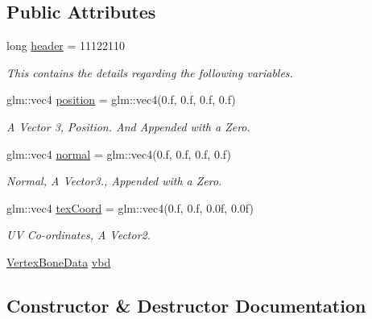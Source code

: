 \subsection*{Public Attributes}
\begin{DoxyCompactItemize}
\item 
long \mbox{\hyperlink{structpiolot_1_1_animated_vertex_data_aceada2166f0ac3779f700d39f6eee5c1}{header}} = 11122110
\begin{DoxyCompactList}\small\item\em This contains the details regarding the following variables. \end{DoxyCompactList}\item 
glm\+::vec4 \mbox{\hyperlink{structpiolot_1_1_animated_vertex_data_a9947f0e7811c173ff80c1cf345ec5d42}{position}} = glm\+::vec4(0.f, 0.f, 0.f, 0.f)
\begin{DoxyCompactList}\small\item\em A Vector 3, Position. And Appended with a Zero. \end{DoxyCompactList}\item 
glm\+::vec4 \mbox{\hyperlink{structpiolot_1_1_animated_vertex_data_a42fe3afa838bcb9951849b914fd43a9d}{normal}} = glm\+::vec4(0.f, 0.f, 0.f, 0.f)
\begin{DoxyCompactList}\small\item\em Normal, A Vector3., Appended with a Zero. \end{DoxyCompactList}\item 
glm\+::vec4 \mbox{\hyperlink{structpiolot_1_1_animated_vertex_data_ad8c5dfde767f37338b9f5497081ae0e6}{tex\+Coord}} = glm\+::vec4(0.f, 0.f, 0.\+0f, 0.\+0f)
\begin{DoxyCompactList}\small\item\em UV Co-\/ordinates, A Vector2. \end{DoxyCompactList}\item 
\mbox{\hyperlink{structpiolot_1_1_vertex_bone_data}{Vertex\+Bone\+Data}} \mbox{\hyperlink{structpiolot_1_1_animated_vertex_data_a8c62a1712805dbfeb4f136c9f5bd90f3}{vbd}}
\end{DoxyCompactItemize}


\subsection{Constructor \& Destructor Documentation}
\mbox{\label{structpiolot_1_1_animated_vertex_data_a0f3f76292e605de2aa5ceb0148f1da74}} 
